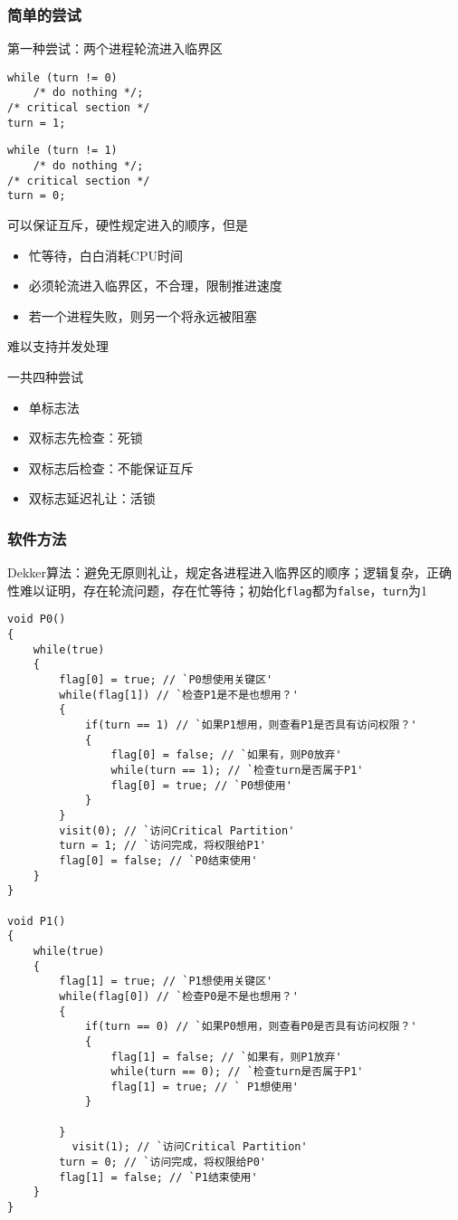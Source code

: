 \subsubsection{简单的尝试}
第一种尝试：两个进程轮流进入临界区
\begin{minipage}{0.5\linewidth}
\begin{lstlisting}
while (turn != 0)
    /* do nothing */;
/* critical section */
turn = 1;
\end{lstlisting}
\end{minipage}
\begin{minipage}{0.5\linewidth}
\begin{lstlisting}
while (turn != 1)
    /* do nothing */;
/* critical section */
turn = 0;
\end{lstlisting}
\end{minipage}
可以保证互斥，硬性规定进入的顺序，但是
\begin{itemize}
    \item 忙等待，白白消耗CPU时间
    \item 必须轮流进入临界区，不合理，限制推进速度
    \item 若一个进程失败，则另一个将永远被阻塞
\end{itemize}
难以支持并发处理

一共四种尝试
\begin{itemize}
    \item 单标志法
    \item 双标志先检查：死锁
    \item 双标志后检查：不能保证互斥
    \item 双标志延迟礼让：活锁
\end{itemize}

\subsubsection{软件方法}
Dekker算法：避免无原则礼让，规定各进程进入临界区的顺序；逻辑复杂，正确性难以证明，存在轮流问题，存在忙等待；初始化\verb'flag'都为\verb'false'，\verb'turn'为1
\begin{lstlisting}
void P0()
{
	while(true)
	{
		flag[0] = true; // `P0想使用关键区'
		while(flag[1]) // `检查P1是不是也想用？'
		{
			if(turn == 1) // `如果P1想用，则查看P1是否具有访问权限？'
			{
				flag[0] = false; // `如果有，则P0放弃'
				while(turn == 1); // `检查turn是否属于P1'
				flag[0] = true; // `P0想使用'
			}
		}
		visit(0); // `访问Critical Partition'
		turn = 1; // `访问完成，将权限给P1'
		flag[0] = false; // `P0结束使用'
	}
}

void P1()
{
	while(true)
	{
		flag[1] = true; // `P1想使用关键区'
		while(flag[0]) // `检查P0是不是也想用？'
		{
			if(turn == 0) // `如果P0想用，则查看P0是否具有访问权限？'
			{
				flag[1] = false; // `如果有，则P1放弃'
				while(turn == 0); // `检查turn是否属于P1'
				flag[1] = true; // ` P1想使用'
			}

		}
		  visit(1); // `访问Critical Partition'
		turn = 0; // `访问完成，将权限给P0'
		flag[1] = false; // `P1结束使用'
	}
}
\end{lstlisting}

